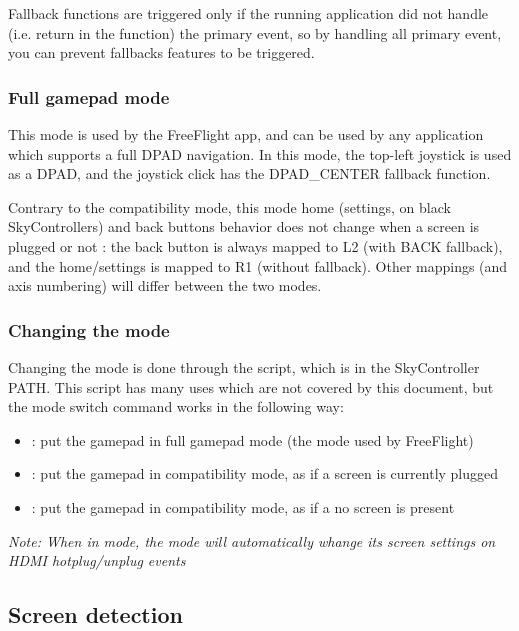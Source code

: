 Fallback functions are triggered only if the running application did not handle (i.e. return  in the  function) the primary event, so by handling all primary event, you can prevent fallbacks features to be triggered.

\subsubsection{Full gamepad mode}

This mode is used by the FreeFlight app, and can be used by any application which supports a full DPAD navigation. In this mode, the top-left joystick is used as a DPAD, and the joystick click has the DPAD\_CENTER fallback function.

Contrary to the compatibility mode, this mode home (settings, on black SkyControllers) and back buttons behavior does not change when a screen is plugged or not : the back button is always mapped to L2 (with BACK fallback), and the home/settings is mapped to R1 (without fallback). Other mappings (and axis numbering) will differ between the two modes.

\subsubsection{Changing the mode}

Changing the mode is done through the  script, which is in the SkyController PATH. This script has many uses which are not covered by this document, but the mode switch command works in the following way:

\begin{itemize}
\item {} : put the gamepad in full gamepad mode (the mode used by FreeFlight)
\item {} : put the gamepad in compatibility mode, as if a screen is currently plugged
\item {} : put the gamepad in compatibility mode, as if a no screen is present
\end{itemize}

\emph{Note: When in  mode, the mode will automatically whange its screen settings on HDMI hotplug/unplug events}

\subsection{Screen detection}

